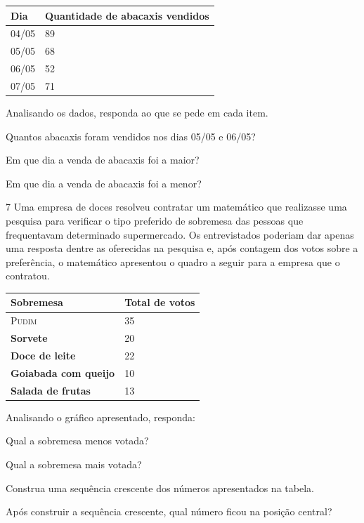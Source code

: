 \begin{longtable}[]{@{}ll@{}}
\toprule
\hline
\textbf{Dia} & \textbf{Quantidade de abacaxis vendidos}\tabularnewline
\hline
\midrule
\endhead
04/05 & 89\tabularnewline
\hline
05/05 & 68\tabularnewline
\hline
06/05 & 52\tabularnewline
\hline
07/05 & 71\tabularnewline
\bottomrule
\end{longtable}

Analisando os dados, responda ao que se pede em cada item.

\pagebreak

\begin{escolha}
\item Quantos abacaxis foram vendidos nos dias 05/05 e 06/05?

\item Em que dia a venda de abacaxis foi a maior?

\item Em que dia a venda de abacaxis foi a menor?
\end{escolha}

\num{7} Uma empresa de doces resolveu contratar um matemático que realizasse uma
pesquisa para verificar o tipo preferido de sobremesa das pessoas que
frequentavam determinado supermercado. Os entrevistados poderiam dar
apenas uma resposta dentre as oferecidas na pesquisa e, após contagem dos
votos sobre a preferência, o matemático apresentou o quadro a seguir
para a empresa que o contratou.

\begin{longtable}[]{@{}ll@{}}
\toprule
\hline
\textbf{Sobremesa} & \textbf{Total de votos}\tabularnewline
\hline
\midrule
\endhead
\textsc{Pudim} & 35\tabularnewline
\hline
\textbf{Sorvete} & 20\tabularnewline
\hline
\textbf{Doce de leite} & 22\tabularnewline
\hline
\textbf{Goiabada com queijo} & 10\tabularnewline
\hline
\textbf{Salada de frutas} & 13\tabularnewline
\hline
\bottomrule
\end{longtable}

Analisando o gráfico apresentado, responda:

\begin{escolha}
\item Qual a sobremesa menos votada?

\item Qual a sobremesa mais votada?

\item Construa uma sequência crescente dos números apresentados na tabela.

\item Após construir a sequência crescente, qual número ficou na posição central?
\end{escolha}

